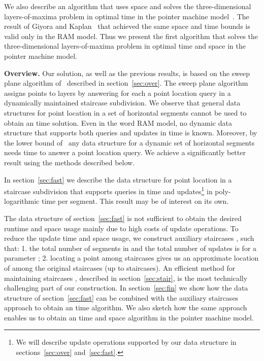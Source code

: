 \documentclass[10pt]{llncs}
\begin{document}
We also describe an algorithm 
that uses  space and solves the three-dimensional layers-of-maxima 
problem in optimal  time in the pointer machine model~\cite{T79}. 
The result of Giyora and Kaplan~\cite{GK09} that achieved the 
same space and time bounds is valid only in the RAM model. 
Thus we present  the first algorithm that solves the three-dimensional
 layers-of-maxima problem in optimal time and space in the pointer 
machine model. 

{\bf Overview.}
Our solution, as well as the previous results,  is based on the sweep
 plane algorithm of~\cite{BG04} described 
in section~\ref{sec:over}. The sweep plane algorithm assigns points 
to layers by answering for each   a point location query in a 
dynamically maintained staircase subdivision. 
We observe that general data structures for point location in a  
set of horizontal segments cannot be used to obtain an  time
 solution. Even in the word RAM model, no dynamic data structure that
 supports both queries and updates in  time is known. 
Moreover, by the lower bound 
of~\cite{AHR98} any data structure for a dynamic set of horizontal segments 
needs  time to answer a point location 
query. We achieve a significantly better result using the methods 
described below.

In section~\ref{sec:fast} we describe the data structure for point location 
in a staircase subdivision that supports queries in 
 time and updates\footnote{
We will describe update operations supported by our data structure in 
sections~\ref{sec:over} and~\ref{sec:fast}.} 
in poly-logarithmic time per segment. This result may be of interest on its 
own.

The data structure of section~\ref{sec:fast} is not sufficient to obtain 
the desired runtime and space usage mainly due to high costs of  update 
operations. To reduce the update time and space usage,  we construct 
auxiliary staircases , such that: 1. the total number 
of segments in  and the total number of updates is   
for a parameter ; 
2. locating a point  among staircases  gives us an approximate 
location of  among the original staircases  (up to  
staircases).
An efficient method 
for maintaining staircases , described in section~\ref{sec:stair}, 
is the most technically challenging part of our construction.
In section~\ref{sec:fin} we show how the data structure of
 section~\ref{sec:fast} can be combined with the auxiliary staircases 
approach to obtain an  time algorithm. 
We also sketch how the same approach enables us to obtain 
an  time and  space algorithm in the pointer machine model.
\end{document}
